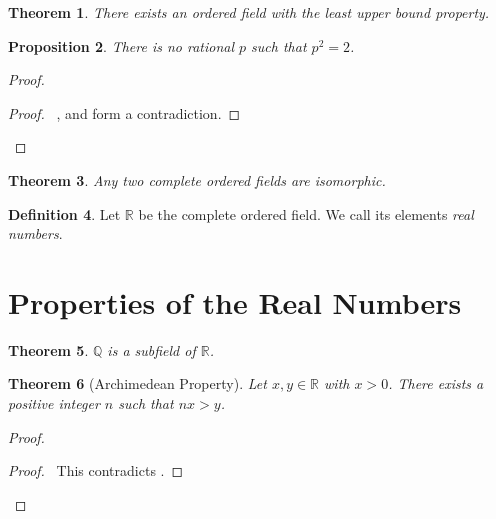\documentclass{book}
\let\qed\relax
\newtheorem{prop}{Proposition}[chapter]
\newtheorem{thm}[prop]{Theorem}
\theoremstyle{definition}
\newtheorem{df}[prop]{Definition}
\begin{document}
\begin{thm}
There exists an ordered field with the least upper bound property.
\end{thm}

\begin{prop}
There is no rational $p$ such that $p^2 = 2$.
\end{prop}

\begin{proof}
\pf
{}
\qedstep
\begin{proof}
	\pf\ ,  and  form a contradiction.
\end{proof}
\qed
\end{proof}

\begin{thm}
Any two complete ordered fields are isomorphic.
\end{thm}


\begin{df}
Let $\mathbb{R}$ be the complete ordered field. We call its elements \emph{real numbers}.
\end{df}

\section{Properties of the Real Numbers}

\begin{thm}
$\mathbb{Q}$ is a subfield of $\mathbb{R}$.
\end{thm}


\begin{thm}[Archimedean Property]
Let $x,y \in \mathbb{R}$ with $x > 0$. There exists a positive integer $n$ such that $nx > y$.
\end{thm}

\begin{proof}
\pf
{}
\qedstep
\begin{proof}
\pf\ This contradicts .
\end{proof}
\qed
\end{proof}
\end{document}
